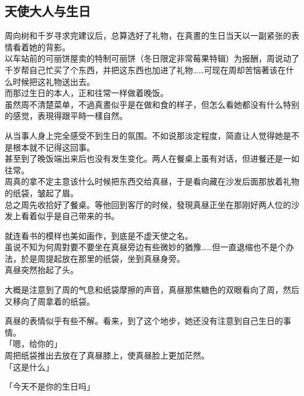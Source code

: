 \subsection{天使大人与生日}

周向树和千岁寻求完建议后，总算选好了礼物，在真晝的生日当天以一副紧张的表情看着她的背影。\\

以车站前的可丽饼屋卖的特制可丽饼（冬日限定非常莓果特辑）为报酬，周说动了千岁帮自己忙买了个东西，并把这东西也加进了礼物……可现在周却苦恼著该在什么时候把这礼物送出去。\\

而那过生日的本人，正和往常一样做着晚饭。\\

虽然周不清楚菜单，不過真晝似乎是在做和食的样子，但怎么看她都没有什么特别的感觉，表現得跟平時一樣自然。

从当事人身上完全感受不到生日的氛围。不如说那淡定程度，简直让人觉得她是不是根本就不记得这回事。\\

甚至到了晚饭端出来后也没有发生变化。两人在餐桌上虽有对话，但进餐还是一如往常。\\

周真的拿不定主意该什么时候把东西交给真昼，于是看向藏在沙发后面那放着礼物的纸袋，皱起了眉。\\

总之周先收拾好了餐桌。等他回到客厅的时候，發現真昼正坐在那刚好两人位的沙发上看着似乎是自己带来的书。

就连看书的模样也美如画作，到底是不虚天使之名。\\

虽说不知为何周對要不要坐在真昼旁边有些微妙的猶豫……但一直退缩也不是个办法，於是周提起放在那里的纸袋，坐到真昼身旁。\\

真昼突然抬起了头。

大概是注意到了周的气息和纸袋摩擦的声音，真昼那焦糖色的双眼看向了周，然后又移向了周拿着的纸袋。

真昼的表情似乎有些不解。看来，到了这个地步，她还没有注意到自己生日的事情。\\

「嗯，给你的」\\

周把纸袋推出去放在了真昼膝上，使真昼脸上更加茫然。\\

「这是什么」

「今天不是你的生日吗」

